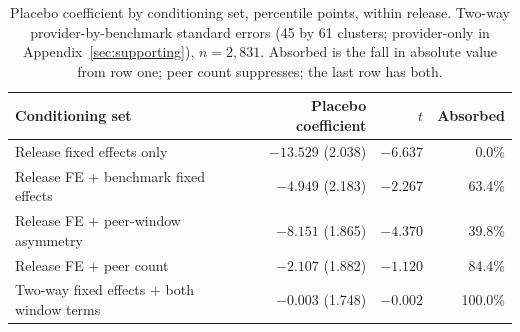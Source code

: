\begin{table}[!htb]
\centering
\small
\begin{tabular}{lrrr}
\toprule
Conditioning set & Placebo coefficient & $t$ & Absorbed \\
\midrule
Release fixed effects only & $-13.529$ (2.038) & $-6.637$ & 0.0\% \\
Release FE + benchmark fixed effects & $-4.949$ (2.183) & $-2.267$ & 63.4\% \\
Release FE + peer-window asymmetry & $-8.151$ (1.865) & $-4.370$ & 39.8\% \\
Release FE + peer count & $-2.107$ (1.882) & $-1.120$ & 84.4\% \\
Two-way fixed effects + both window terms & $-0.003$ (1.748) & $-0.002$ & 100.0\% \\
\bottomrule
\end{tabular}
\caption{%
Placebo coefficient by conditioning set, percentile points, within release. Two-way provider-by-benchmark standard errors (45 by 61 clusters; provider-only in Appendix~\ref{sec:supporting}), $n = 2{,}831$. Absorbed is the fall in absolute value from row one; peer count suppresses; the last row has both.}
\label{tab:decomposition}
\end{table}
